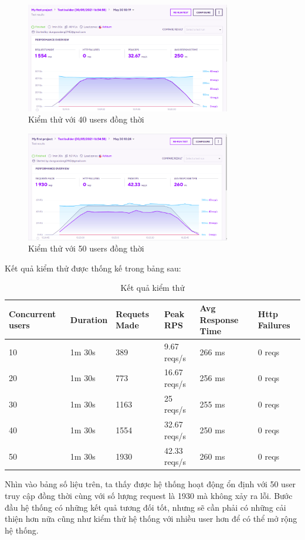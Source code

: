 		\begin{figure}[!ht]
			\includegraphics[width=0.8\textwidth]{Images/testing/testing_40.png}
			\centering
			\linebreak
			\caption{Kiểm thử với 40 users đồng thời}
		\end{figure}
	\newpage
		\begin{figure}[!ht]
			\includegraphics[width=0.8\textwidth]{Images/testing/testing_50.png}
			\centering
			\linebreak
			\caption{Kiểm thử với 50 users đồng thời}
		\end{figure}
		    Kết quả kiểm thử được thống kế trong bảng sau:
        \begin{center}
        \begin{table}[!htp]
        \begin{tabular}{|p{2cm}|p{2cm}|p{2cm}|p{2.5cm}|p{4cm}|p{2.5cm}|}
        \hline 
        Concurrent users & Duration & Requets Made & Peak RPS & Avg Response Time & Http Failures\\ 
        \hline 
        10 & 1m 30s & 389 & 9.67 reqs/s & 266 ms & 0 reqs\\ 
        \hline
        20 & 1m 30s & 773 &  16.67 reqs/s & 256 ms & 0 reqs\\
        \hline 
        30 & 1m 30s & 1163 & 25 reqs/s & 255 ms & 0 reqs\\
        \hline
        40 & 1m 30s & 1554 & 32.67 reqs/s & 250 ms & 0 reqs\\
        \hline
        50 & 1m 30s & 1930 & 42.33 reqs/s & 260 ms & 0 reqs\\
        \hline
        \end{tabular}
        \caption{Kết quả kiểm thử}
        \end{table}
        \end{center}
        Nhìn vào bảng số liệu trên, ta thấy được hệ thống hoạt động ổn định với 50 user truy cập đồng thời cùng với số lượng request là 1930 mà không xảy ra lỗi. Bước đầu hệ thống có những kết quả tương đối tốt, nhưng sẽ cần phải có những cải thiện hơn nữa cũng như kiểm thử  hệ thống với nhiều user hơn để có thể mở rộng hệ thống.
